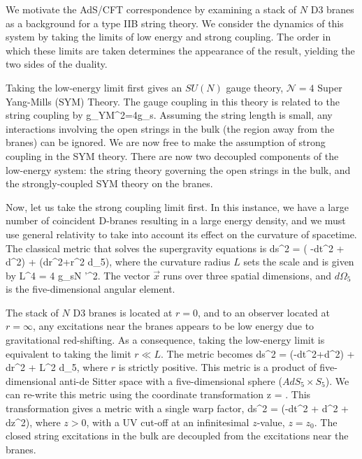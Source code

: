 We motivate the AdS/CFT correspondence by examining a stack of $N$ D3 branes as a background for a type IIB string theory.
We consider the dynamics of this system by taking the limits of low energy and strong coupling. 
The order in which these limits are taken determines the appearance of the result, yielding the two sides of the duality.

Taking the low-energy limit first gives an $SU(N)$ gauge theory, $\mathcal{N} =4 $ Super Yang-Mills (SYM) Theory.\footnotemark 
The gauge coupling in this theory is related to the string coupling by
\be
g_{YM}^2=4\pi g_s.
\label{eq:gYM}
\ee
{}
Assuming the string length is small, any interactions involving the open strings in the bulk (the region away from the branes) can be ignored.
We are now free to make the assumption of strong coupling in the SYM theory.
There are now two decoupled components of the low-energy system: the string theory governing the open strings in the bulk, and the strongly-coupled SYM theory on the branes.

Now, let us take the strong coupling limit first. 
In this instance, we have a large number of coincident D-branes resulting in a large energy density, and we must use general relativity to take into account its effect on the curvature of spacetime.
The classical metric that solves the supergravity equations is
\be
 \label{equSGmetric}
ds^{2} = \left( -dt^{2} + d^{2}\right) + (dr^{2}+r^2 d\Omega_5),
\ee
where the curvature radius $L$ sets the scale and is given by\cite{Witten:1995im,Horowitz:1991cd}
\be
L^{4} = 4 \pi g_{s}N \alpha'^{2}.
\label{eq:L4}
\ee
The vector $\vec{x}$ runs over three spatial dimensions, and $d\Omega_5$ is the five-dimensional angular element.

The stack of $N$ D3 branes is located at $r=0$, and to an observer located at $r=\infty$, any excitations near the branes appears to be low energy due to gravitational red-shifting.
As a consequence, taking the low-energy limit is equivalent to taking the limit $r \ll L$.
The metric becomes
\be
\label{equ10drmetric}
ds^{2} =  (-dt^{2}+d^{2}) + dr^{2} + L^2 d\Omega_{5},
\ee
where $r$ is strictly positive.
This metric is a product of five-dimensional anti-de Sitter space with a five-dimensional sphere ($AdS_5\times S_5$).
We can re-write this metric using the coordinate transformation
\be
z = .
\ee
This transformation gives a metric with a single warp factor,
\be
\label{equ5dzmetric}
ds^{2} = \left(-dt^{2} + d^{2} + dz^{2}\right),
\ee
where  $z>0$, with a UV cut-off at an infinitesimal $z$-value, $z=z_0$.  
The closed string excitations in the bulk are decoupled from the excitations near the branes.

